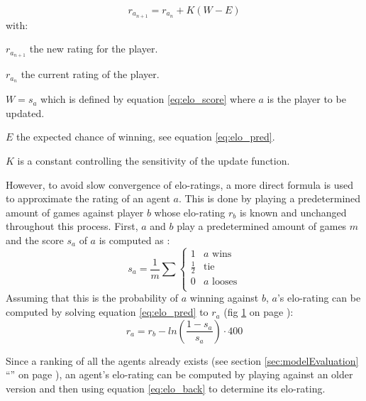 \documentclass[12pt]{article}
\newcommand{\imgRef}[1]{(fig \ref{#1} on page \pageref{#1})}
\newcommand{\sectionref}[1]{section \ref{#1} ``\nameref{#1}'' on page \pageref{#1}}
\begin{document}
\begin{equation} \label{eq:elo_update}
r_{a_{n+1}} = r_{a_n} + K(W - E)
\end{equation}
with:
\begin{description}
\item \(r_{a_{n+1}}\) the new rating for the player.
\item \(r_{a_n}\) the current rating of the player.
\item \(W = s_a\) which is defined by equation \ref{eq:elo_score} where \(a\) is the player to be updated.
\item \(E\) the expected chance of winning, see equation \ref{eq:elo_pred}.
\item \(K\) is a constant controlling the sensitivity of the update function.
\end{description}
However, to avoid slow convergence of elo-ratings, a more direct formula is used to approximate the rating of an agent \(a\). This is done by playing a predetermined amount of games against player \(b\) whose elo-rating \(r_b\) is known and unchanged throughout this process. First, \(a\) and \(b\) play a predetermined amount of games \(m\) and the score \(s_a\) of \(a\) is computed as \cite{elo1978rating}:
\begin{equation} \label{eq:elo_score}
s_a = \frac{1}{m}\sum\left\{
\begin{array}{ll}
1 &              a\textrm{ wins} \\
\frac{1}{2} & \textrm{tie}\\
0 &              a\textrm{ looses}\\
\end{array}
\right.
\end{equation}
Assuming that this is the probability of \(a\) winning against \(b\), \(a\)'s elo-rating can be computed by solving equation \ref{eq:elo_pred} to \(r_a\) \imgRef{fig:eloInv}:
\begin{equation} \label{eq:elo_back}
r_a = r_b - ln\left(\frac{1-s_a}{s_a}\right) \cdot 400
\end{equation}
\begin{figure}
\center

\label{fig:eloInv}
\end{figure}

\noindent
Since a ranking of all the agents already exists (see \sectionref{sec:modelEvaluation}), an agent's elo-rating can be computed by playing against an older version and then using equation \ref{eq:elo_back} to determine its elo-rating. 
\end{document}
